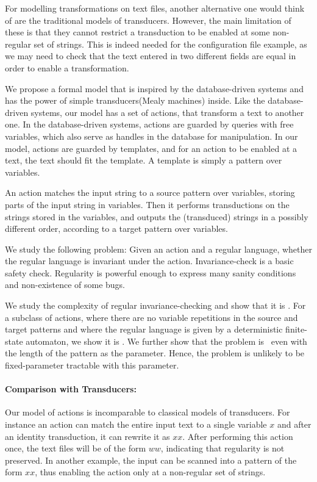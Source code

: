 \documentclass[12pt, a4paper]{article}
\begin{document}
For modelling transformations on text files, another alternative one would think of are the traditional models of transducers. However, the main limitation of these is that they cannot restrict a transduction to be enabled at some non-regular set of strings. This is indeed needed for the configuration file example, as we may need to check that the text entered in two different fields are equal in order to enable a transformation. 
 
We propose a formal model that is inspired by the database-driven systems and has the power of simple transducers(Mealy machines) inside. Like the database-driven systems, our model has a set of actions, that transform a text to another one. In the database-driven systems, actions are guarded by queries with free variables, which also serve as handles in the database for manipulation. In our model, actions are guarded by templates, and for an action to be enabled at a text, the text should fit the template. A template is simply a pattern over variables. 

An action matches the input string to a source pattern over variables, storing parts of the input string in variables. Then it performs transductions on the strings stored in the variables, and outputs the (transduced) strings in a possibly different order, according to a target pattern over variables. 

We study the following problem: Given an action and a regular language, whether the regular language is invariant under the action. Invariance-check is a basic safety check. Regularity is powerful enough to express many sanity conditions and non-existence of some bugs.

We study the complexity of regular invariance-checking and show that it is \pspc. For a subclass of actions, where there are no variable repetitions in the source and target patterns and where the regular language is given by a deterministic finite-state automaton, we show it is \conpc. We further show that the problem is \woneh\ even with the length of the pattern as the parameter. Hence, the problem is unlikely to be fixed-parameter tractable with this parameter. 

\paragraph*{Comparison with Transducers: }Our model of actions is incomparable to classical models of transducers. For instance an action can match the entire input text to a single variable $x$ and after an identity transduction, it can rewrite it as $xx$. After performing this action once, the text files will be of the form $ww$, indicating that regularity is not preserved. In another example, the input can be scanned into a pattern of the form $xx$, thus enabling the action only at a non-regular  set of strings. 
\end{document}
